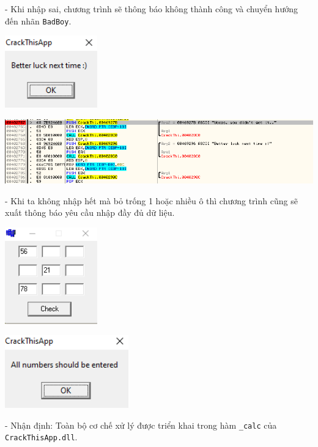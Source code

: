 - Khi nhập sai, chương trình sẽ thông báo không thành công và chuyển hướng đến nhãn \texttt{BadBoy}.
\begin{center}
	\includegraphics[width=0.3\textwidth]{img/file-1/image4_0.png}
\end{center} 
\begin{center}
	\includegraphics[width=\textwidth]{img/file-1/image4.png}
\end{center}

- Khi ta không nhập hết mà bỏ trống 1 hoặc nhiều ô thì chương trình cũng sẽ xuất thông báo yêu cầu nhập đầy đủ dữ liệu.\\
\begin{center}
	\includegraphics[width=0.3\textwidth]{img/file-1/image12_0.png}
\end{center}   

\begin{center}
	\includegraphics[width=0.4\textwidth]{img/file-1/image12_1.png}
\end{center}  

- Nhận định: Toàn bộ cơ chế xử lý được triển khai trong hàm \texttt{\_calc} của \texttt{CrackThisApp.dll}.

